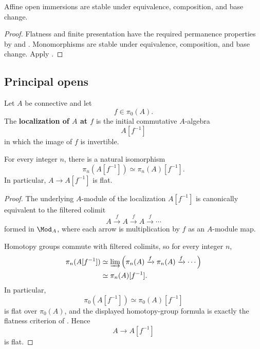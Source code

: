 \begin{proposition}
\label{prop:affine-open-permanence}
Affine open immersions are stable under equivalence, composition, and base
change.
\end{proposition}

\begin{proof}
Flatness and finite presentation have the required permanence properties
by  and
. Monomorphisms are stable under
equivalence, composition, and base change. Apply
.
\end{proof}

\subsection{Principal opens}

\begin{construction}
\label{con:spectral-localization}
Let $A$ be connective and let
\[
    f\in\pi_0(A).
\]
The \textbf{localization of $A$ at $f$} is the initial commutative
$A$-algebra
\[
    A[f^{-1}]
\]
in which the image of $f$ is invertible.
\end{construction}

\begin{proposition}
\label{prop:homotopy-groups-localization}
For every integer $n$, there is a natural isomorphism
\[
    \pi_n(A[f^{-1}])
    \simeq
    \pi_n(A)[f^{-1}].
\]
In particular, $A\to A[f^{-1}]$ is flat.
\end{proposition}\begin{proof}
The underlying $A$-module of the localization $A[f^{-1}]$ is canonically
equivalent to the filtered colimit
\[
    A
    \xrightarrow{f}
    A
    \xrightarrow{f}
    A
    \xrightarrow{f}
    \cdots
\]
formed in $\Mod_A$, where each arrow is multiplication by $f$ as an
$A$-module map.

Homotopy groups commute with filtered colimits, so for every integer $n$,
\[
\begin{aligned}
    \pi_n(A[f^{-1}])
    &\simeq
    \varinjlim
    \left(
        \pi_n(A)
        \xrightarrow{f}
        \pi_n(A)
        \xrightarrow{f}
        \cdots
    \right)
    \\
    &\simeq
    \pi_n(A)[f^{-1}].
\end{aligned}
\]
In particular,
\[
    \pi_0(A[f^{-1}])
    \simeq
    \pi_0(A)[f^{-1}]
\]
is flat over $\pi_0(A)$, and the displayed homotopy-group formula is
exactly the flatness criterion of
. Hence
\[
    A\longrightarrow A[f^{-1}]
\]
is flat.
\end{proof}

